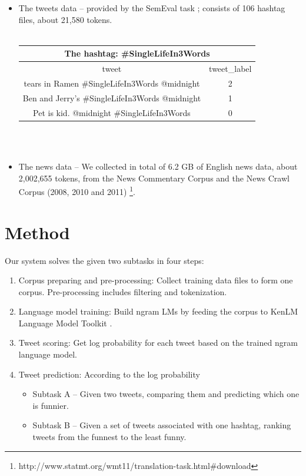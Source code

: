 \documentclass[a0,portrait]{a0poster}
\begin{document}
\begin{multicols}{2}
\begin{itemize}
\item The tweets data -- provided by the SemEval task ; consists of 106 hashtag files, about 21,580 tokens.\\\\
\begin{tabular}{ c | c } 
\toprule
\multicolumn{2}{c}{The hashtag:	\#SingleLifeIn3Words} \\
\hline
tweet & tweet\_label\\ 
\hline
tears in Ramen \#SingleLifeIn3Words @midnight & 2 \\ 
\hline
Ben and Jerry's \#SingleLifeIn3Words @midnight & 1 \\
\hline
Pet is kid. @midnight \#SingleLifeIn3Words & 0 \\
\bottomrule
\end{tabular}
\\\\
\item The news data -- We collected in total of 6.2 GB of English news data, about 2,002,655 tokens, from the News Commentary Corpus and the News Crawl Corpus (2008, 2010 and 2011) \footnote{http://www.statmt.org/wmt11/translation-task.html\#download}.
\end{itemize}





\color{DarkSlateGray} %
\section*{\LARGE Method}
Our system solves the given two subtasks in four steps:
\begin{enumerate}
\item Corpus preparing and pre-processing: Collect training data files to form one corpus. Pre-processing includes filtering and tokenization.
\item Language model training: Build ngram LMs by feeding the corpus to KenLM Language Model Toolkit \cite{Heafield-estimate}. 
\item Tweet scoring: Get log probability for each tweet based on the trained ngram language model.
\item Tweet prediction: According to the log probability
\begin{itemize}
\item Subtask A -- Given two tweets, comparing them and predicting which one is funnier. 
\item Subtask B -- Given a set of tweets associated with one hashtag, ranking tweets from the funnest to the least funny.
\end{itemize}
\end{enumerate}


\end{multicols}
\end{document}
